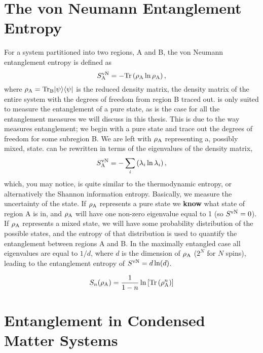 \section{The von Neumann Entanglement Entropy}
For a system partitioned into two regions, A and B, the von Neumann entanglement entropy \vn is defined as
\begin{equation}
	S^{\text{vN}}_\text{A} = -\rm{Tr}\left({\rho_A \ln \rho_A}\right),
\end{equation}
where $\rho_{\rm{A}}=\rm{Tr}_B\lvert {\psi} \rangle\langle {\psi} \rvert$ is the reduced density matrix, the density matrix of the entire system with the degrees of freedom from region B traced out.
\vn is only suited to measure the entanglement of a pure state, as is the case for all the entanglement measures we will discuss in this thesis.
This is due to the way \vn measures entanglement; we begin with a pure state and trace out the degrees of freedom for some subregion B.  
We are left with $\rho_{\rm A}$ representing a, possibly mixed, state.
\vn can be rewritten in terms of the eigenvalues of the density matrix,
\begin{equation}
S^{\text{vN}}_\text{A} = -\sum_i \left(\lambda_i \ln \lambda_i\right),
\end{equation}
which, you may notice, is quite similar to the thermodynamic entropy, or alternatively the Shannon information entropy.
Basically, we measure the uncertainty of the state.  If $\rho_{\rm A}$ represents a pure state we {\bf know} what state of region A is in, and $\rho_{\rm A}$ will have one non-zero eigenvalue equal to 1 (so $S^{\text{vN}} = 0$).
If $\rho_{\rm A}$ represents a mixed state, we will have some probability distribution of the possible states, and the entropy of that distribution is used to quantify the entanglement between regions A and B.
In the maximally entangled case all eigenvalues are equal to $1/d$, where $d$ is the dimension of $\rho_{\rm A}$ ($2^N$ for $N$ spins), leading to the entanglement entropy of $S^{\text{vN}}= d\ln (d)$.


\begin{equation} \label{renyi}
 	S_n(\rho_{\rm A}) = \frac{1}{1-n}\ln\left[{\rm Tr}\left( \rho_{\rm A}^n \right) \right]
\end{equation}


\section{Entanglement in Condensed Matter Systems}



